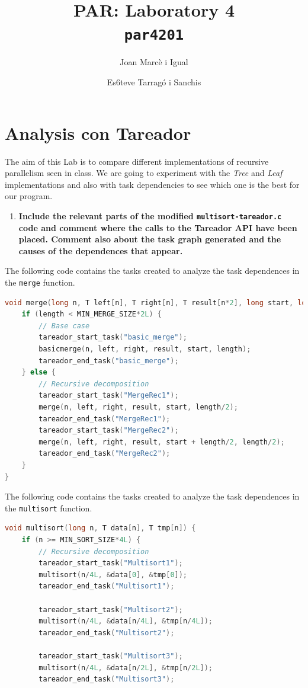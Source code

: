 \documentclass[a4paper]{article}
\title{PAR: Laboratory 4 \\
		\texttt{\large par4201}}
\author{Joan Marcè i Igual \and Es6teve Tarragó i Sanchis}
\newenvironment{questionenum}{%
\setlist[enumerate]{resume}
\restartlist{enumerate}
\newcommand{\question}[1]{
\begin{enumerate}
	\item\bfseries ##1
\end{enumerate}
}}{%
}
\begin{document}
\maketitle
\tableofcontents

\section{Analysis con Tareador}
The aim of this Lab is to compare different implementations of recursive parallelism seen in class. We are going to experiment with the \emph{Tree} and \emph{Leaf} implementations and also with task dependencies to see which one is the best for our program.

\begin{questionenum}
	\question{Include the relevant parts of the modified \texttt{multisort-tareador.c} code and comment where the calls to the Tareador API have been placed. Comment also about the task graph generated and the causes of the dependences that appear.}
	
	The following code contains the tasks created to analyze the task dependences in the \verb|merge| function.
\begin{lstlisting}[language=C]
void merge(long n, T left[n], T right[n], T result[n*2], long start, long length) {
	if (length < MIN_MERGE_SIZE*2L) {
		// Base case
		tareador_start_task("basic_merge");
		basicmerge(n, left, right, result, start, length);
		tareador_end_task("basic_merge");
	} else {
		// Recursive decomposition
		tareador_start_task("MergeRec1");
		merge(n, left, right, result, start, length/2);
		tareador_end_task("MergeRec1");
		tareador_start_task("MergeRec2");
		merge(n, left, right, result, start + length/2, length/2);
		tareador_end_task("MergeRec2");
	}
}
\end{lstlisting}

	The following code contains the tasks created to analyze the task dependences in the \verb|multisort| function.
	
\begin{lstlisting}[language=C]
void multisort(long n, T data[n], T tmp[n]) {
	if (n >= MIN_SORT_SIZE*4L) {
		// Recursive decomposition
		tareador_start_task("Multisort1");
		multisort(n/4L, &data[0], &tmp[0]);
		tareador_end_task("Multisort1");
		
		tareador_start_task("Multisort2");
		multisort(n/4L, &data[n/4L], &tmp[n/4L]);
		tareador_end_task("Multisort2");
		
		tareador_start_task("Multisort3");
		multisort(n/4L, &data[n/2L], &tmp[n/2L]);
		tareador_end_task("Multisort3");
		

\end{lstlisting}
\end{questionenum}
\end{document}
